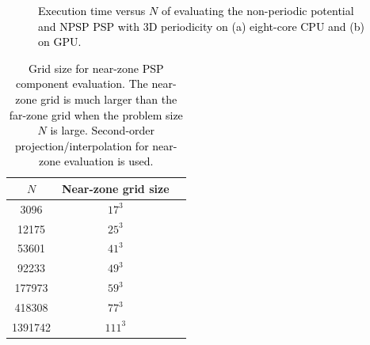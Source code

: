 \documentclass{article}
\begin{document}
\begin{figure}[htbp]
    \centering
    \quad
    \caption{\textcolor{black}{Execution time versus $N$ of evaluating the non-periodic potential and \textcolor{black}{NPSP} PSP with 3D periodicity on (a) eight-core CPU and (b) on GPU.}} \label{fig:performance}
\end{figure}

\begin{table}[htbp]
  \centering
  \begin{tabular}{ccc}
    \hline
    $N$ & Near-zone grid size   \\
    \hline
    3096 & $17^3$\\
    12175 & $25^3$ \\
    53601 & $41^3$ \\
    92233 & $49^3$ \\
    177973 & $59^3$ \\
    418308 & $77^3$ \\
    1391742 & $111^3$
\end{tabular}
\caption{\textcolor{black}{Grid size for near-zone PSP component evaluation. The near-zone grid is much larger than the far-zone grid when the problem size $N$ is large. Second-order projection/interpolation for near-zone evaluation is used.}} \label{tab:near-zone}
\end{table}
\end{document}
